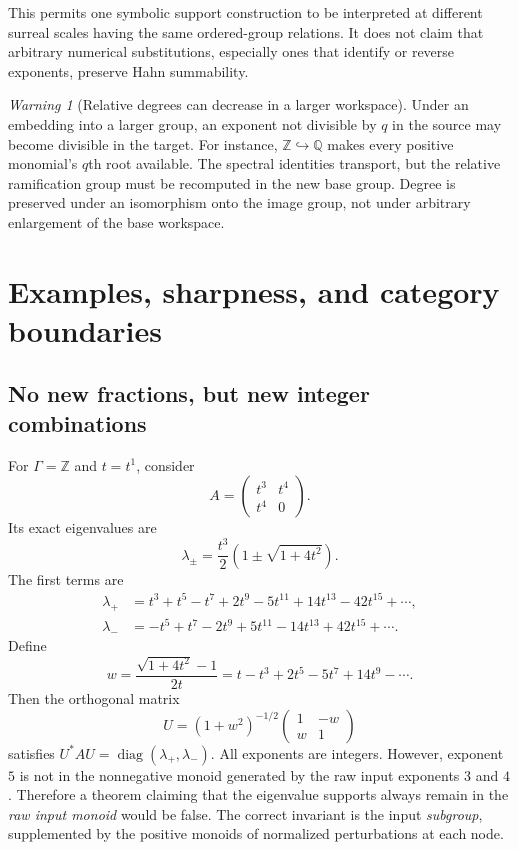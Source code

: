 \documentclass[11pt,letterpaper]{article}
\numberwithin{equation}{section}
\theoremstyle{definition}
\theoremstyle{remark}
\newtheorem{warning}[theorem]{Warning}
\newcommand{\Q}{\mathbb Q}
\newcommand{\Z}{\mathbb Z}
\newcommand{\diag}{\operatorname{diag}}
\begin{document}
This permits one symbolic support construction to be interpreted at different
surreal scales having the same ordered-group relations. It does not claim
that arbitrary numerical substitutions, especially ones that identify or
reverse exponents, preserve Hahn summability.

\begin{warning}[Relative degrees can decrease in a larger workspace]
Under an embedding into a larger group, an exponent not divisible by $q$ in
the source may become divisible in the target. For instance,
$\Z\hookrightarrow\Q$ makes every positive monomial's $q$th root available.
The spectral identities transport, but the relative ramification group must
be recomputed in the new base group. Degree is preserved under an isomorphism
onto the image group, not under arbitrary enlargement of the base workspace.
\end{warning}

\section{Examples, sharpness, and category boundaries}
\label{sec:examples}

\subsection{No new fractions, but new integer combinations}

For $\Gamma=\Z$ and $t=t^1$, consider
\begin{equation}\label{eq:t3matrix}
 A=\begin{pmatrix}t^3&t^4\\t^4&0\end{pmatrix}.
\end{equation}
Its exact eigenvalues are
\[
 \lambda_\pm=\frac{t^3}{2}\left(1\pm\sqrt{1+4t^2}\right).
\]
The first terms are
\begin{align*}
 \lambda_+&=t^3+t^5-t^7+2t^9-5t^{11}+14t^{13}-42t^{15}+\cdots,\\
 \lambda_-&=-t^5+t^7-2t^9+5t^{11}-14t^{13}+42t^{15}+\cdots.
\end{align*}
Define
\[
 w=\frac{\sqrt{1+4t^2}-1}{2t}
      =t-t^3+2t^5-5t^7+14t^9-\cdots.
\]
Then the orthogonal matrix
\[
 U=(1+w^2)^{-1/2}
      \begin{pmatrix}1&-w\\w&1\end{pmatrix}
\]
satisfies $U^*AU=\diag(\lambda_+,\lambda_-)$. All exponents are integers.
However, exponent $5$ is not in the nonnegative monoid generated by the raw
input exponents $3$ and $4$. Therefore a theorem claiming that the eigenvalue
supports always remain in the \emph{raw input monoid} would be false.
The correct invariant is the input \emph{subgroup}, supplemented by the
positive monoids of normalized perturbations at each node.
\end{document}
